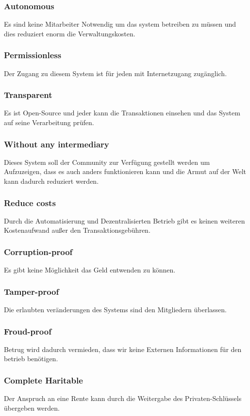 \subsubsection*{Autonomous}
Es sind keine Mitarbeiter Notwendig um das system betreiben zu müssen und dies reduziert enorm die Verwaltungskosten.
\subsubsection*{Permissionless}
Der Zugang zu diesem System ist für jeden mit Internetzugang zugänglich.
\subsubsection*{Transparent}
Es ist Open-Source und jeder kann die Transaktionen einsehen und das System auf seine Verarbeitung prüfen.
\subsubsection*{Without any intermediary}
Dieses System soll der Community zur Verfügung gestellt werden um Aufzuzeigen, dass es auch anders funktionieren kann und die Armut auf der Welt kann dadurch reduziert werden.
\subsubsection*{Reduce costs}
Durch die Automatisierung und Dezentralisierten Betrieb gibt es keinen weiteren Kostenaufwand außer den Transaktionsgebühren.
\subsubsection*{Corruption-proof}
Es gibt keine Möglichkeit das Geld entwenden zu können.
\subsubsection*{Tamper-proof}
Die erlaubten veränderungen des Systems sind den Mitgliedern überlassen.
\subsubsection*{Froud-proof}
Betrug wird dadurch vermieden, dass wir keine Externen Informationen für den betrieb benötigen.
\subsubsection*{Complete Haritable}
Der Anspruch an eine Rente kann durch die Weitergabe des Privaten-Schlüssels übergeben werden.
